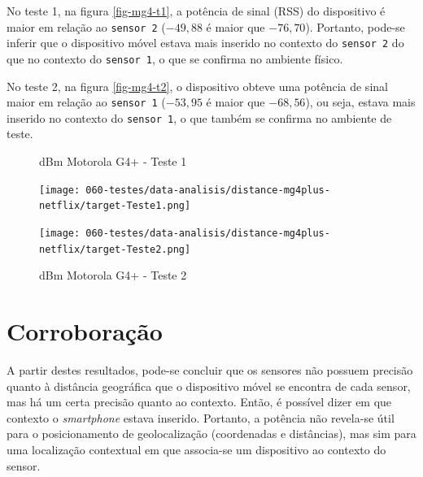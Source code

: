 No teste 1, na figura \autoref{fig-mg4-t1}, a potência de sinal (RSS) do
dispositivo é maior em relação ao \texttt{sensor 2} ($-49,88$ é maior que
$-76,70$). Portanto, pode-se inferir que o dispositivo móvel estava mais
inserido no contexto do \texttt{sensor 2} do que no contexto do \texttt{sensor
1}, o que se confirma no ambiente físico.

No teste 2, na figura \autoref{fig-mg4-t2}, o dispositivo obteve uma potência de
sinal maior em relação ao \texttt{sensor 1} ($-53,95$ é maior que $-68,56$), ou
seja, estava mais inserido no contexto do \texttt{sensor 1}, o que também se
confirma no ambiente de teste.

\begin{figure}[htb]
	\label{mg4-distance}
	\centering
	\begin{minipage}{0.49\textwidth}
	\centering
		\caption{\label{fig-mg4-t1}dBm Motorola G4+ - Teste 1}
		\texttt{[image: 060-testes/data-analisis/distance-mg4plus-netflix/target-Teste1.png]}
	\end{minipage}
	\hfill
	\begin{minipage}{0.49\textwidth}
	\centering
		\caption{\label{fig-mg4-t2}dBm Motorola G4+ - Teste 2}
		\texttt{[image: 060-testes/data-analisis/distance-mg4plus-netflix/target-Teste2.png]}
	\end{minipage}
\end{figure}

\FloatBarrier

\section{Corroboração}\label{sec-corroboração}

A partir destes resultados, pode-se concluir que os sensores não possuem
precisão quanto à distância geográfica que o dispositivo móvel se encontra de
cada sensor, mas há um certa precisão quanto ao contexto. Então, é possível
dizer em que contexto o \emph{smartphone} estava inserido. Portanto, a potência
não revela-se útil para o posicionamento de geolocalização (coordenadas e
distâncias), mas sim para uma localização contextual em que associa-se um
dispositivo ao contexto do sensor.

